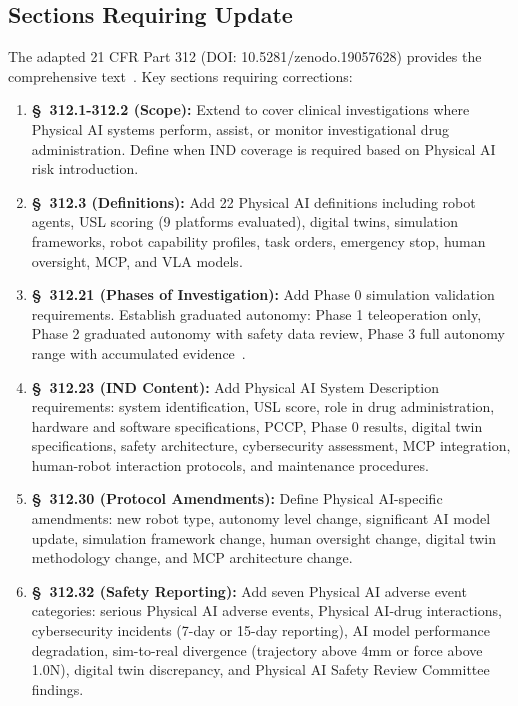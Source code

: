 \documentclass[11pt,letterpaper]{article}
\begin{document}
\subsection{Sections Requiring Update}

The adapted 21 CFR Part 312 (DOI: 10.5281/zenodo.19057628) provides the
comprehensive text~\cite{cfr312adapt}. Key sections requiring corrections:

\begin{enumerate}[label=(\alph*)]
\item \textbf{\S~312.1-312.2 (Scope):} Extend to cover clinical investigations
  where Physical AI systems perform, assist, or monitor investigational drug
  administration. Define when IND coverage is required based on Physical AI
  risk introduction.

\item \textbf{\S~312.3 (Definitions):} Add 22 Physical AI definitions
  including robot agents, USL scoring (9 platforms evaluated), digital twins,
  simulation frameworks, robot capability profiles, task orders, emergency
  stop, human oversight, MCP, and VLA models.

\item \textbf{\S~312.21 (Phases of Investigation):} Add Phase 0 simulation
  validation requirements. Establish graduated autonomy: Phase 1 teleoperation
  only, Phase 2 graduated autonomy with safety data review, Phase 3 full
  autonomy range with accumulated evidence~\cite{cfr312adapt}.

\item \textbf{\S~312.23 (IND Content):} Add Physical AI System Description
  requirements: system identification, USL score, role in drug administration,
  hardware and software specifications, PCCP, Phase 0 results, digital twin
  specifications, safety architecture, cybersecurity assessment, MCP
  integration, human-robot interaction protocols, and maintenance procedures.

\item \textbf{\S~312.30 (Protocol Amendments):} Define Physical AI-specific
  amendments: new robot type, autonomy level change, significant AI model
  update, simulation framework change, human oversight change, digital twin
  methodology change, and MCP architecture change.

\item \textbf{\S~312.32 (Safety Reporting):} Add seven Physical AI adverse
  event categories: serious Physical AI adverse events, Physical AI-drug
  interactions, cybersecurity incidents (7-day or 15-day reporting), AI model
  performance degradation, sim-to-real divergence (trajectory above 4mm or
  force above 1.0N), digital twin discrepancy, and Physical AI Safety Review
  Committee findings.


\end{enumerate}
\end{document}
